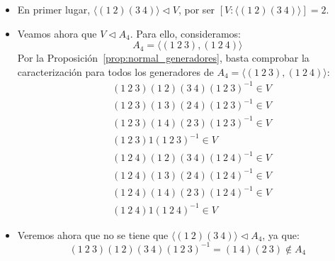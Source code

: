 \begin{ejemplo}
\begin{enumerate}
\begin{figure}[H]
            \end{figure}
            \begin{itemize}
                \item En primer lugar, $\langle (1\ 2)(3\ 4) \rangle \lhd V $, por ser $[V:\langle (1\ 2)(3\ 4) \rangle ] = 2$.
                \item Veamos ahora que $V\lhd A_4$. Para ello, consideramos:
                    \begin{equation*}
                        A_4 = \langle (1\ 2\ 3), (1\ 2\ 4) \rangle 
                    \end{equation*}
                    Por la Proposición~\ref{prop:normal_generadores}, basta comprobar la caracterización para todos los generadores de $A_4 = \langle (1\ 2\ 3), (1\ 2\ 4) \rangle $:
                    \begin{align*}
                        &(1\ 2\ 3)(1\ 2)(3\ 4){(1\ 2\ 3)}^{-1} \in  V \\
                        &(1\ 2\ 3)(1\ 3)(2\ 4){(1\ 2\ 3)}^{-1} \in  V \\
                        &(1\ 2\ 3)(1\ 4)(2\ 3){(1\ 2\ 3)}^{-1} \in  V \\
                        &(1\ 2\ 3)1{(1\ 2\ 3)}^{-1} \in  V \\
                        &(1\ 2\ 4)(1\ 2)(3\ 4){(1\ 2\ 4)}^{-1} \in  V \\
                        &(1\ 2\ 4)(1\ 3)(2\ 4){(1\ 2\ 4)}^{-1} \in  V \\
                        &(1\ 2\ 4)(1\ 4)(2\ 3){(1\ 2\ 4)}^{-1} \in  V \\
                        &(1\ 2\ 4)1{(1\ 2\ 4)}^{-1} \in  V 
                    \end{align*}
                \item Veremos ahora que no se tiene que $\langle (1\ 2)(3\ 4) \rangle\lhd A_4 $, ya que:
                    \begin{equation*}
                        (1\ 2\ 3)(1\ 2)(3\ 4){(1\ 2\ 3)}^{-1} = (1\ 4)(2\ 3)\notin A_4
                    \end{equation*}
            \end{itemize}
    \end{enumerate}
\end{ejemplo}

